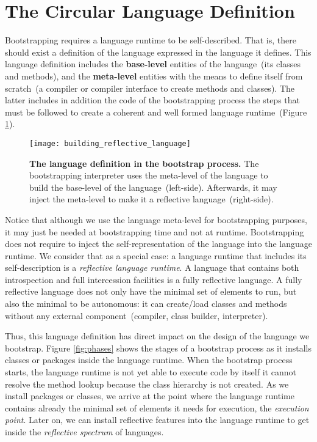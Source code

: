 \section{The Circular Language Definition}\label{sec:circular_definition}

Bootstrapping requires a language runtime to be self-described. That is, there should exist a definition of the language expressed in the language it defines. This language definition includes the \textbf{base-level} entities of the language~(its classes and methods), and the \textbf{meta-level} entities with the means to define itself from scratch~(\eg a compiler or compiler interface to create methods and classes). The latter includes in addition the code of the bootstrapping process \ie the steps that must be followed to create a coherent and well formed language runtime~(Figure \ref{fig:language_definition}).

\begin{figure}[ht]
\center
\texttt{[image: building\_reflective\_language]}
\caption{\textbf{The language definition in the bootstrap process.} The bootstrapping interpreter uses the meta-level of the language to build the base-level of the language~(left-side). Afterwards, it may inject the meta-level to make it a reflective language~(right-side).\label{fig:language_definition}}
\end{figure}

Notice that although we use the language meta-level for bootstrapping purposes, it may just be needed at bootstrapping time and not at runtime. Bootstrapping does not require to inject the self-representation of the language into the language runtime. We consider that as a special case: a language runtime that includes its self-description is a \emph{reflective language runtime}.
A language that contains both introspection and full intercession facilities is a fully reflective language. A fully reflective language does not only have the minimal set of elements to run, but also the minimal to be autonomous: it can create/load classes and methods without any external component~(compiler, class builder, interpreter).

Thus, this language definition has direct impact on the design of the language we bootstrap. Figure \ref{fig:phases} shows the stages of a bootstrap process as it installs classes or packages inside the language runtime. When the bootstrap process starts, the language runtime is not yet able to execute code by itself \eg it cannot resolve the method lookup because the class hierarchy is not created. As we install packages or classes, we arrive at the point where the language runtime contains already the minimal set of elements it needs for execution, the \emph{execution point}. Later on, we can install reflective features into the language runtime to get inside the \emph{reflective spectrum} of languages. 

